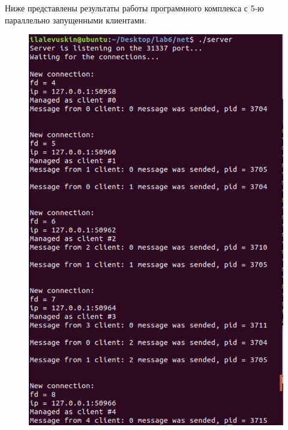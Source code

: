 \documentclass[a4paper,12pt]{article}
\begin{document}
	Ниже представлены результаты работы программного комплекса с 5-ю параллельно запущенными клиентами.
	
	\begin{figure}[h!]
		\begin{center}
			\begin{minipage}[h!]{0.5\linewidth}
				\includegraphics[width=1\linewidth]{test_server_1_2.png}
			\end{minipage}
			\begin{minipage}[h!]{0.49\linewidth}

\end{minipage}
\end{center}
\end{figure}
\end{document}
